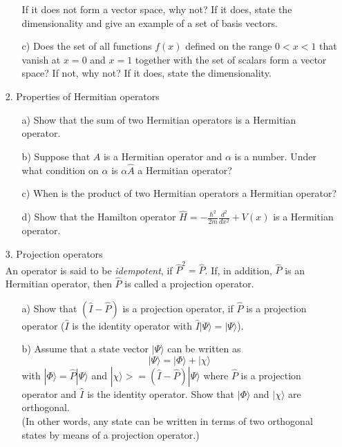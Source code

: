 \documentclass[11pt]{article}
\begin{document}
\begin{itemize}
\begin{itemize}
    If it does not form a vector space, why not? If it does, state the dimensionality and give an example of a set of basis vectors.
\item[c)] 
    Does the set of all functions $f(x)$ defined on the range $0 < x < 1$ that vanish at $x=0$ and $x=1$ together with the set of scalars form a vector space?  If not, why not? If it does, state the dimensionality.
\end{itemize}
%
\vspace*{0.1cm}
%
\item[2.] Properties of Hermitian operators
\begin{itemize}
\item[a)] Show that the sum of two Hermitian operators is a Hermitian operator.
\item[b)] Suppose that $\hat{A}$ is a Hermitian operator and $\alpha$ is a number. Under what condition on $\alpha$ is $\alpha\hat{A}$ a Hermitian operator?
\item[c)] When is the product of two Hermitian operators a Hermitian operator?
\item[d)] Show that the Hamilton operator ${\hat H} = -\frac{\hbar^2}{2m}\frac{d^2}{dx^2} + V(x)$ is a Hermitian operator.
\end{itemize}
%
\vspace*{0.1cm}
\item[3.] Projection operators\\
An operator is said to be {\it idempotent}, if ${\hat P}^2 = {\hat P}$. If, in addition, ${\hat P}$ is an Hermitian operator, then ${\hat P}$ is called a projection operator.
\begin{itemize}
\item[a)] 
Show that $\left({\hat I} - {\hat P}\right)$ is a projection operator, if ${\hat P}$ is a projection operator (${\hat I}$ is the identity operator with ${\hat I} |\Psi\rangle = |\Psi\rangle$).
\item[b)]
Assume that a state vector $|\Psi \rangle$ can be written as 
\begin{displaymath}
|\Psi \rangle = |\Phi\rangle + |\chi\rangle
\end{displaymath}
with $|\Phi\rangle = {\hat P}|\Psi \rangle$ and $|\chi\rangle> = \left({\hat I} - {\hat P}\right)|\Psi \rangle$ where ${\hat P}$ is a projection operator and ${\hat I}$ is the identity operator. Show that $|\Phi\rangle$ and $|\chi\rangle$ are orthogonal.\\
(In other words, any state can be written in terms of two orthogonal states by means of a projection operator.) 

\end{itemize}
\end{itemize}
\end{document}
